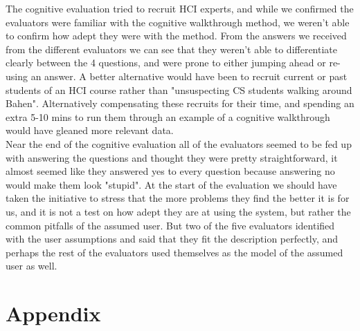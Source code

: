 \documentclass[pdftex,12pt,a4paper]{report}
\begin{document}
The cognitive evaluation tried to recruit HCI experts, and while we confirmed the evaluators were familiar with the cognitive walkthrough method, we weren't able to confirm how adept they were with the method. From the answers we received from the different evaluators we can see that they weren't able to differentiate clearly between the 4 questions, and were prone to either jumping ahead or re-using an answer. A better alternative would have been to recruit current or past students of an HCI course rather than "unsuspecting CS students walking around Bahen". Alternatively compensating these recruits for their time, and spending an extra 5-10 mins to run them through an example of a cognitive walkthrough would have gleaned more relevant data. \\

Near the end of the cognitive evaluation all of the evaluators seemed to be fed up with answering the questions and thought they were pretty straightforward, it almost seemed like they answered yes to every question because answering no would make them look "stupid". At the start of the evaluation we should have taken the initiative to stress that the more problems they find the better it is for us, and it is not a test on how adept they are at using the system, but rather the common pitfalls of the assumed user. But two of the five evaluators identified with the user assumptions and said that they fit the description perfectly, and perhaps the rest of the evaluators used themselves as the model of the assumed user as well.\\

\chapter{Appendix}
\end{document}
